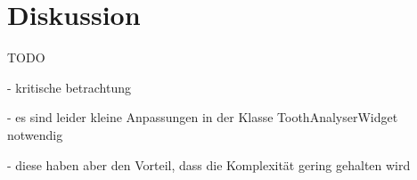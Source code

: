 \chapter{Diskussion}
\label{chap:diskussion}TODO

- kritische betrachtung

- es sind leider kleine Anpassungen in der Klasse ToothAnalyserWidget notwendig

- diese haben aber den Vorteil, dass die Komplexität gering gehalten wird